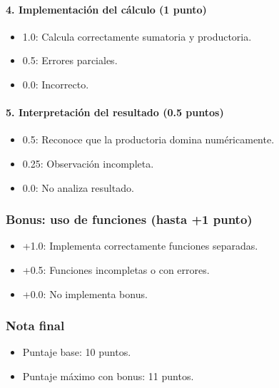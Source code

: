 \begin{solution}
\paragraph{4. Implementación del cálculo (1 punto)}
\begin{itemize}
    \item 1.0: Calcula correctamente sumatoria y productoria.
    \item 0.5: Errores parciales.
    \item 0.0: Incorrecto.
\end{itemize}

\paragraph{5. Interpretación del resultado (0.5 puntos)}
\begin{itemize}
    \item 0.5: Reconoce que la productoria domina numéricamente.
    \item 0.25: Observación incompleta.
    \item 0.0: No analiza resultado.
\end{itemize}

\vspace{0.5cm}

\subsubsection*{Bonus: uso de funciones (hasta +1 punto)}

\begin{itemize}
    \item +1.0: Implementa correctamente funciones separadas.
    \item +0.5: Funciones incompletas o con errores.
    \item +0.0: No implementa bonus.
\end{itemize}

\vspace{0.5cm}

\subsubsection*{Nota final}

\begin{itemize}
    \item Puntaje base: 10 puntos.
    \item Puntaje máximo con bonus: 11 puntos.
\end{itemize}

\end{solution}
